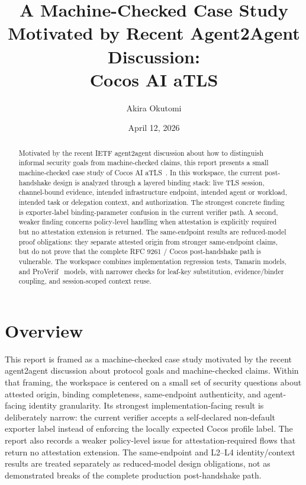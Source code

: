 \documentclass[11pt,a4paper]{article}
\title{A Machine-Checked Case Study Motivated by Recent Agent2Agent Discussion:\\Cocos AI aTLS}
\author{Akira Okutomi}
\date{April 12, 2026}
\begin{document}
\maketitle

\begin{abstract}
Motivated by the recent IETF agent2agent discussion about how to distinguish
informal security goals from machine-checked claims, this report presents a
small machine-checked case study of Cocos AI aTLS~\cite{cocosrepo}. In this
workspace, the current post-handshake design is analyzed through a layered
binding stack: live TLS session, channel-bound evidence, intended
infrastructure endpoint, intended agent or workload, intended task or
delegation context, and authorization. The strongest concrete finding is
exporter-label binding-parameter confusion in the current verifier path. A
second, weaker finding concerns policy-level handling when attestation is
explicitly required but no attestation extension is returned. The
same-endpoint results are reduced-model proof obligations: they separate
attested origin from stronger same-endpoint claims, but do not prove that the
complete RFC 9261 / Cocos post-handshake path is vulnerable. The workspace
combines implementation regression tests, Tamarin models, and
ProVerif~\cite{tamarin,proverif} models, with narrower checks for leaf-key
substitution, evidence/binder coupling, and session-scoped context reuse.
\end{abstract}

\section{Overview}

This report is framed as a machine-checked case study motivated by the recent
agent2agent discussion about protocol goals and machine-checked claims. Within
that framing, the workspace is centered on a small set of security questions
about attested origin, binding completeness, same-endpoint authenticity, and
agent-facing identity granularity. Its strongest implementation-facing result
is deliberately narrow: the current verifier accepts a self-declared
non-default exporter label instead of enforcing the locally expected Cocos
profile label. The report also records a weaker policy-level issue for
attestation-required flows that return no attestation extension. The
same-endpoint and L2--L4 identity/context results are treated separately as
reduced-model design obligations, not as demonstrated breaks of the complete
production post-handshake path.
\end{document}

